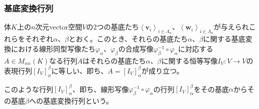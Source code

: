 \documentclass[dvipdfmx]{jsarticle}
\begin{document}
\subsubsection{基底変換行列}%
\begin{thm}
\label{2.1.5.9}
体$K$上の$n$次元vector空間$V$の2つの基底たち$\left\langle \mathbf{v}_{i} \right\rangle_{i \in \varLambda_{n}}$、$\left\langle \mathbf{w}_{i} \right\rangle_{i \in \varLambda_{n}}$が与えられこれらをそれぞれ$\alpha$、$\beta$とおく。このとき、それらの基底たち$\alpha$、$\beta$に関する基底変換における線形同型写像たち$\varphi_{\alpha}$、$\varphi_{\beta}$の合成写像$\varphi_{\beta}^{- 1} \circ \varphi_{\alpha}$に対応する$A \in M_{nn}(K)$なる行列$A$はそれらの基底たち$\alpha$、$\beta$に関する恒等写像$I_{V}:V \rightarrow V$の表現行列$\left[ I_{V} \right]^{\beta}_{\alpha}$に等しい、即ち、$A = \left[ I_{V} \right]^{\beta}_{\alpha}$が成り立つ。
\end{thm}
\begin{dfn}
このような行列$\left[ I_{V} \right]^{\beta}_{\alpha}$、即ち、線形写像$\varphi_{\beta}^{- 1} \circ \varphi_{\alpha}$の行列$\left[ I_{V} \right]^{\beta}_{\alpha}$をその基底$\alpha$からその基底$\beta$への基底変換行列という。
\end{dfn}
\end{document}
